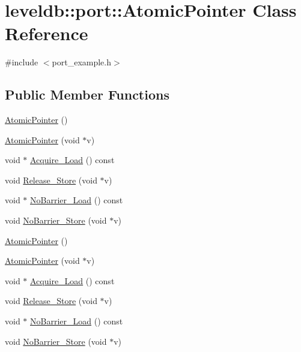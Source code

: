 \hypertarget{classleveldb_1_1port_1_1_atomic_pointer}{}\section{leveldb\+:\+:port\+:\+:Atomic\+Pointer Class Reference}
\label{classleveldb_1_1port_1_1_atomic_pointer}


{\ttfamily \#include $<$port\+\_\+example.\+h$>$}

\subsection*{Public Member Functions}
\begin{DoxyCompactItemize}
\item 
\hyperlink{classleveldb_1_1port_1_1_atomic_pointer_a046bde8475164356d81353741b18a408}{Atomic\+Pointer} ()
\item 
\hyperlink{classleveldb_1_1port_1_1_atomic_pointer_aa8640431ad3d0ac2f0de62ef6090e89e}{Atomic\+Pointer} (void $\ast$v)
\item 
void $\ast$ \hyperlink{classleveldb_1_1port_1_1_atomic_pointer_a92aa118983e28711a150b3907af59a54}{Acquire\+\_\+\+Load} () const 
\item 
void \hyperlink{classleveldb_1_1port_1_1_atomic_pointer_a8dfe51c125f71c09a363dae042be63a7}{Release\+\_\+\+Store} (void $\ast$v)
\item 
void $\ast$ \hyperlink{classleveldb_1_1port_1_1_atomic_pointer_a6f1579bd734aa549f237eeb4f486cfd3}{No\+Barrier\+\_\+\+Load} () const 
\item 
void \hyperlink{classleveldb_1_1port_1_1_atomic_pointer_aa7faab23777d1fe3c1a96d32a28ed20c}{No\+Barrier\+\_\+\+Store} (void $\ast$v)
\item 
\hyperlink{classleveldb_1_1port_1_1_atomic_pointer_a046bde8475164356d81353741b18a408}{Atomic\+Pointer} ()
\item 
\hyperlink{classleveldb_1_1port_1_1_atomic_pointer_aa8640431ad3d0ac2f0de62ef6090e89e}{Atomic\+Pointer} (void $\ast$v)
\item 
void $\ast$ \hyperlink{classleveldb_1_1port_1_1_atomic_pointer_a25b7cd07f114f6e59278d5523aff6140}{Acquire\+\_\+\+Load} () const 
\item 
void \hyperlink{classleveldb_1_1port_1_1_atomic_pointer_a8dfe51c125f71c09a363dae042be63a7}{Release\+\_\+\+Store} (void $\ast$v)
\item 
void $\ast$ \hyperlink{classleveldb_1_1port_1_1_atomic_pointer_ac11845e17d85f9de46b6c66979374f8f}{No\+Barrier\+\_\+\+Load} () const 
\item 
void \hyperlink{classleveldb_1_1port_1_1_atomic_pointer_aa7faab23777d1fe3c1a96d32a28ed20c}{No\+Barrier\+\_\+\+Store} (void $\ast$v)
\end{DoxyCompactItemize}


